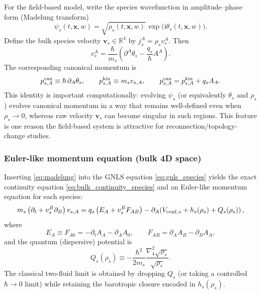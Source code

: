 \documentclass[11pt]{article}
\newcommand{\ii}{\mathrm{i}}
\newcommand{\R}{\mathbb{R}}
\newcommand{\x}{\mathbf{x}}     %
\newcommand{\lapfour}{\nabla_4^2}
\begin{document}
For the field-based model, write the species wavefunction in amplitude--phase form
(Madelung transform)
\begin{equation}
\psi_s(t,\x,w)=\sqrt{\rho_s(t,\x,w)}\,\exp\!\big(\ii\theta_s(t,\x,w)\big).
\label{eq:madelung}
\end{equation}
Define the bulk species velocity \(\mathbf{v}_s\in\R^4\) by \(j_s^A=\rho_s v_s^A\).
Then
\begin{equation}
v_s^A
=
\frac{\hbar}{m_s}\left(\partial^A\theta_s - \frac{q_s}{\hbar}A^A\right).
\label{eq:velocity_def}
\end{equation}
The corresponding canonical momentum is
\begin{equation}
p^{\rm can}_{s,A} \equiv \hbar\,\partial_A\theta_s,
\qquad
p^{\rm kin}_{s,A}\equiv m_s v_{s,A},
\qquad
p^{\rm can}_{s,A} = p^{\rm kin}_{s,A} + q_s A_A.
\label{eq:canonical_momentum}
\end{equation}
This identity is important computationally: evolving \(\psi_s\) (or equivalently
\(\theta_s\) and \(\rho_s\)) evolves canonical momentum in a way that remains
well-defined even when \(\rho_s\to 0\), whereas raw velocity \(\mathbf{v}_s\) can
become singular in such regions. This feature is one reason the field-based system
is attractive for reconnection/topology-change studies.

\subsubsection*{Euler-like momentum equation (bulk 4D space)}

Inserting \eqref{eq:madelung} into the GNLS equation \eqref{eq:gnls_species} yields
the exact continuity equation \eqref{eq:bulk_continuity_species} and an Euler-like
momentum equation for each species:
\begin{equation}
m_s\left(\partial_t + v_s^B\partial_B\right)v_{s,A}
=
q_s\left(E_A + v_s^B F_{AB}\right)
-\partial_A\!\left(
V_{{\rm conf},s}
+h_s(\rho_s)
+Q_s(\rho_s)
\right),
\label{eq:euler_species_bulk}
\end{equation}
where
\begin{equation}
E_A \equiv F_{A0} = -\partial_t A_A - \partial_A A_0,
\qquad
F_{AB}=\partial_A A_B-\partial_B A_A,
\label{eq:EA_FAB_defs}
\end{equation}
and the quantum (dispersive) potential is
\begin{equation}
Q_s(\rho_s)
\equiv
-\frac{\hbar^2}{2m_s}\frac{\lapfour\sqrt{\rho_s}}{\sqrt{\rho_s}}.
\label{eq:quantum_potential}
\end{equation}
The classical two-fluid limit is obtained by dropping \(Q_s\) (or taking a controlled
\(\hbar\to 0\) limit) while retaining the barotropic closure encoded in \(h_s(\rho_s)\).
\end{document}

